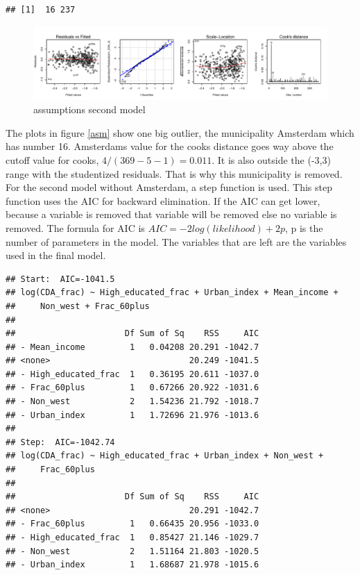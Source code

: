 \documentclass[11pt,]{article}
\begin{document}
\begin{verbatim}
## [1]  16 237
\end{verbatim}

\begin{figure}[H]

{\centering \includegraphics{Report_files/figure-latex/unnamed-chunk-11-1} 

}

\caption{\label{asm}assumptions second model}\label{fig:unnamed-chunk-11}
\end{figure}

The plots in figure \ref{asm} show one big outlier, the municipality
Amsterdam which has number 16. Amsterdams value for the cooks distance
goes way above the cutoff value for cooks, \(4/(369-5-1)=0.011\). It is
also outside the (-3,3) range with the studentized residuals. That is
why this municipality is removed.\\
For the second model without Amsterdam, a step function is used. This
step function uses the AIC for backward elimination. If the AIC can get
lower, because a variable is removed that variable will be removed else
no variable is removed. The formula for AIC is
\(AIC=-2log(likelihood)+2p\), p is the number of parameters in the
model. The variables that are left are the variables used in the final
model.

\begin{verbatim}
## Start:  AIC=-1041.5
## log(CDA_frac) ~ High_educated_frac + Urban_index + Mean_income + 
##     Non_west + Frac_60plus
## 
##                      Df Sum of Sq    RSS     AIC
## - Mean_income         1   0.04208 20.291 -1042.7
## <none>                            20.249 -1041.5
## - High_educated_frac  1   0.36195 20.611 -1037.0
## - Frac_60plus         1   0.67266 20.922 -1031.6
## - Non_west            2   1.54236 21.792 -1018.7
## - Urban_index         1   1.72696 21.976 -1013.6
## 
## Step:  AIC=-1042.74
## log(CDA_frac) ~ High_educated_frac + Urban_index + Non_west + 
##     Frac_60plus
## 
##                      Df Sum of Sq    RSS     AIC
## <none>                            20.291 -1042.7
## - Frac_60plus         1   0.66435 20.956 -1033.0
## - High_educated_frac  1   0.85427 21.146 -1029.7
## - Non_west            2   1.51164 21.803 -1020.5
## - Urban_index         1   1.68687 21.978 -1015.6
\end{verbatim}
\end{document}

